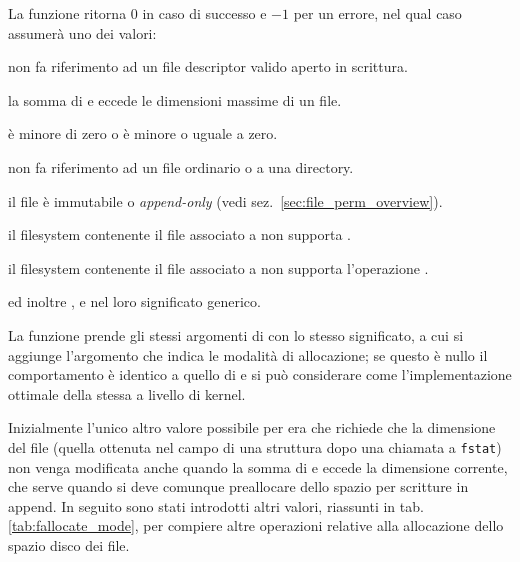 \begin{funcproto}{
}

{La funzione ritorna $0$ in caso di successo e $-1$ per un errore, nel qual
  caso  assumerà uno dei valori: 
  \begin{errlist}
    \item[\errcode{EBADF}]  non fa riferimento ad un file descriptor
      valido aperto in scrittura.
    \item[\errcode{EFBIG}] la somma di  e  eccede le
      dimensioni massime di un file. 
    \item[\errcode{EINVAL}]  è minore di zero o  è
      minore o uguale a zero. 
    \item[\errcode{ENODEV}]  non fa riferimento ad un file ordinario
      o a una directory. 
    \item[\errcode{EPERM}] il file è immutabile o \textit{append-only} (vedi
      sez.~\ref{sec:file_perm_overview}).
    \item[\errcode{ENOSYS}] il filesystem contenente il file associato
      a  non supporta .
    \item[\errcode{EOPNOTSUPP}] il filesystem contenente il file associato
      a  non supporta l'operazione .
  \end{errlist}
  ed inoltre ,  e  nel loro significato
  generico.}
\end{funcproto}

La funzione prende gli stessi argomenti di  con lo
stesso significato, a cui si aggiunge l'argomento  che indica le
modalità di allocazione; se questo è nullo il comportamento è identico a
quello di  e si può considerare  come
l'implementazione ottimale della stessa a livello di kernel.

Inizialmente l'unico altro valore possibile per  era
 che richiede che la dimensione del file
(quella ottenuta nel campo  di una struttura  dopo
una chiamata a \texttt{fstat}) non venga modificata anche quando la somma
di  e  eccede la dimensione corrente, che serve
quando si deve comunque preallocare dello spazio per scritture in append. In
seguito sono stati introdotti altri valori, riassunti in
tab.\ref{tab:fallocate_mode}, per compiere altre operazioni relative alla
allocazione dello spazio disco dei file.

